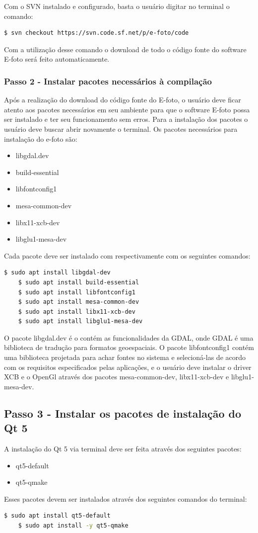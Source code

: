 Com o SVN instalado e configurado, basta o usuário digitar no terminal o comando:
\begin{lstlisting}[language=bash]
 $ svn checkout https://svn.code.sf.net/p/e-foto/code
\end{lstlisting}

Com a utilização desse comando o download de todo o código fonte do software E-foto será feito automaticamente.  
    
\subsubsection{Passo 2 - Instalar pacotes necessários à compilação}  
Após a realização do download do código fonte do E-foto, o usuário deve ficar atento aos pacotes necessários em seu ambiente para que o software E-foto possa ser instalado e ter seu funcionamento sem erros. Para a instalação dos pacotes o usuário deve buscar abrir novamente o terminal. Os pacotes necessários para instalação do e-foto são:
\begin{itemize}
   	\item libgdal.dev
   	\item build-essential
   	\item libfontconfig1
   	\item mesa-common-dev
   	\item libx11-xcb-dev
   	\item libglu1-mesa-dev
\end{itemize}
Cada pacote deve ser instalado com respectivamente com os seguintes comandos:	
\begin{lstlisting}[language=bash]
	$ sudo apt install libgdal-dev
	$ sudo apt install build-essential
	$ sudo apt install libfontconfig1
	$ sudo apt install mesa-common-dev
	$ sudo apt install libx11-xcb-dev 
	$ sudo apt install libglu1-mesa-dev
\end{lstlisting}				
	
O pacote libgdal.dev é o contém as funcionalidades da GDAL, onde GDAL é uma biblioteca de tradução para formatos geoespaciais. O pacote libfontconfig1 contém uma biblioteca projetada para achar fontes no sistema e selecioná-las de acordo com os requisitos especificados pelas aplicações, e o usuário deve instalar o driver XCB e o OpenGl através dos pacotes mesa-common-dev, libx11-xcb-dev e libglu1-mesa-dev. 
    
\subsection{Passo 3 - Instalar os pacotes de instalação do Qt 5}   
A instalação do Qt 5 via terminal deve ser feita através dos seguintes pacotes:
\begin{itemize}
	\item qt5-default
	\item qt5-qmake
\end{itemize}   
Esses pacotes devem ser instalados através dos seguintes comandos do terminal:
\begin{lstlisting}[language=bash]
	$ sudo apt install qt5-default
	$ sudo apt install -y qt5-qmake
\end{lstlisting}	
    
